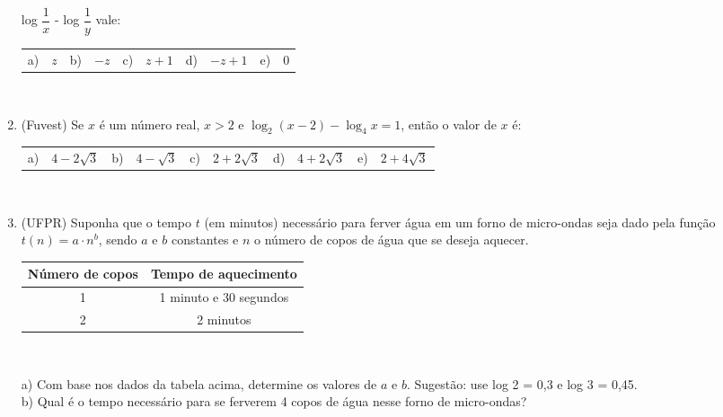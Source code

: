 \documentclass[a4paper, 11pt]{article}
\begin{document}
\begin{enumerate}
        log $\dfrac{1}{x}$ - log $\dfrac{1}{y}$ vale: \\[1.5ex]
        \begin{tabularx}{\textwidth}{lXlXlXlXlX}
            a) & $z$ &
            b) & $-z$ &
            c) & $z+1$ &
            d) & $-z+1$ &
            e) & 0\\
        \end{tabularx} \\[2ex]
        \item (Fuvest) Se $x$ é um número real, $x>2$ e $\log_2(x-2)-\log_4x=1$, então o valor de $x$ é:\\[1.5ex]
        \begin{tabularx}{\textwidth}{lXlXlXlXlX}
            a) & $4-2\sqrt3$ & b) & $4-\sqrt3$ & c) & $2+2\sqrt3$ & d) & $4+2\sqrt3$ & e) & $2+4\sqrt3$\\
        \end{tabularx} \\[2ex]
        \item (UFPR) Suponha que o tempo $t$ (em minutos) necessário para ferver água em um forno de micro-ondas
        seja dado pela função $t(n)=a\cdot n^b$, sendo $a$ e $b$ constantes e $n$ o número de copos de água que
        se deseja aquecer.
        \begin{center}
            \begin{table}[h!]
                \centering
                \begin{tabular}{cc}
                    \toprule
                    \textbf{Número de copos} & \textbf{Tempo de aquecimento} \\
                    \midrule
                    1                        & 1 minuto e 30 segundos        \\
                    2                        & 2 minutos                     \\
                    \bottomrule
                \end{tabular}\label{tab:table2}
            \end{table}\\[1.5ex]
        \end{center}
        a) Com base nos dados da tabela acima, determine os valores de $a$ e $b$. Sugestão: use log 2 = 0,3 e log 3 = 0,45.\\
        b) Qual é o tempo necessário para se ferverem 4 copos de água nesse forno de micro-ondas?\\
    \end{enumerate}
\end{document}
